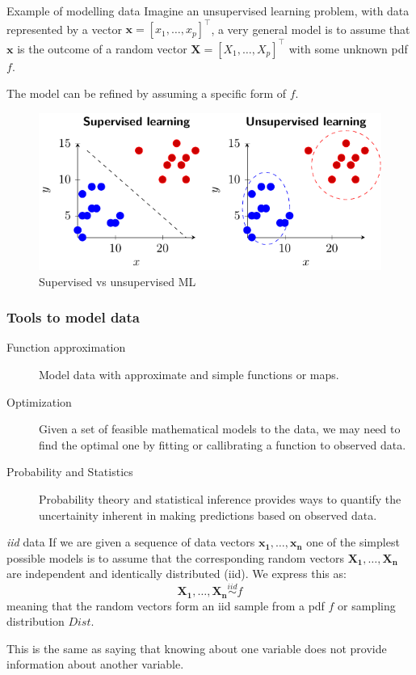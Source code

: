\documentclass{beamer}
\begin{document}
\begin{frame}[allowframebreaks]{Example of modelling data}
  \label{sld:model}
  Imagine an unsupervised learning problem, with data represented by a vector $\bm{x}=[x_1,\ldots,x_p]^\intercal$, a very general model is to assume that $\bm{x}$ is the outcome of a random vector $\bm{X}=[X_1,\ldots,X_p]^\intercal$ with some unknown pdf $f$.

  The model can be refined by assuming a specific form of $f$.
  \begin{figure}
    \includegraphics{supervised_unsupervised}
    \caption{Supervised vs unsupervised ML}
    \label{fig:supunsup}
  \end{figure}

\end{frame}



\begin{frame}
\frametitle{Tools to model data}

\begin{description}
  \item [Function approximation] Model data with approximate and simple functions or maps.
  \item [Optimization] Given a set of feasible mathematical models to the data, we may need to find the optimal one by fitting or callibrating a function to observed data.
  \item [Probability and Statistics] Probability theory and statistical inference provides ways to quantify the uncertainity inherent in making predictions based on observed data.
\end{description}
\end{frame}


\begin{frame}{{\em iid} data}
  If we are given a sequence of data vectors $\bm{x_1},\ldots,\bm{x_n}$ one of the simplest possible models is to assume that the corresponding random vectors $\bm{X_1},\ldots,\bm{X_n}$ are independent and identically distributed (iid). We express this as:
  \[\bm{X_1},\ldots,\bm{X_n} \stackrel{iid}{\sim} f \]
  meaning that the random vectors form an iid sample from a pdf $f$ or sampling distribution $Dist$.

  This is the same as saying that knowing about one variable does not provide information about another variable.
\end{frame}
\end{document}
